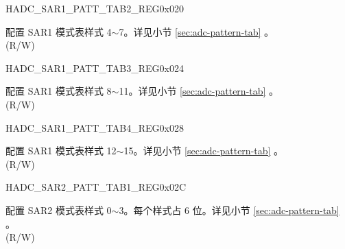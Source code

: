 \begin{register}{H}{ADC\_SAR1\_PATT\_TAB2\_REG}{0x020}\label{regdesc:ADCSAR1PATTTAB2REG}
%
%
\regnewline%
\begin{regdesc}\begin{reglist}
\label{fielddesc:ADCSAR1PATTTAB2}\item [ADC\_SAR1\_PATT\_TAB2] 配置 SAR1 模式表样式 4$\sim$7。详见小节 \ref{sec:adc-pattern-tab} \textit{}。\\
(R/W)
\end{reglist}\end{regdesc}
\end{register}


\begin{register}{H}{ADC\_SAR1\_PATT\_TAB3\_REG}{0x024}\label{regdesc:ADCSAR1PATTTAB3REG}
%
%
\regnewline%
\begin{regdesc}\begin{reglist}
\label{fielddesc:ADCSAR1PATTTAB3}\item [ADC\_SAR1\_PATT\_TAB3] 配置 SAR1 模式表样式 8$\sim$11。详见小节 \ref{sec:adc-pattern-tab} \textit{}。\\
(R/W)
\end{reglist}\end{regdesc}
\end{register}


\begin{register}{H}{ADC\_SAR1\_PATT\_TAB4\_REG}{0x028}\label{regdesc:ADCSAR1PATTTAB4REG}
%
%
\regnewline%
\begin{regdesc}\begin{reglist}
\label{fielddesc:ADCSAR1PATTTAB4}\item [ADC\_SAR1\_PATT\_TAB4] 配置 SAR1 模式表样式 12$\sim$15。详见小节 \ref{sec:adc-pattern-tab} \textit{}。\\
(R/W)
\end{reglist}\end{regdesc}
\end{register}


\begin{register}{H}{ADC\_SAR2\_PATT\_TAB1\_REG}{0x02C}\label{regdesc:ADCSAR2PATTTAB1REG}
%
%
\regnewline%
\begin{regdesc}\begin{reglist}
\label{fielddesc:ADCSAR2PATTTAB1}\item [ADC\_SAR2\_PATT\_TAB1] 配置 SAR2 模式表样式 0$\sim$3。每个样式占 6 位。详见小节 \ref{sec:adc-pattern-tab} \textit{}。\\
(R/W)
\end{reglist}\end{regdesc}
\end{register}



